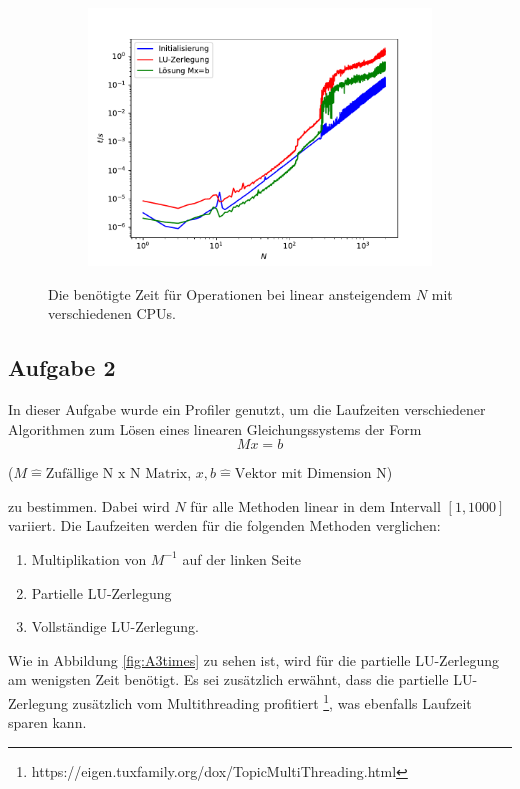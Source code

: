 \documentclass{scrartcl}
\begin{document}
\begin{figure}[h]
\begin{subfigure}{0.4\textwidth}
		\includegraphics[width=\textwidth]{A2/Dann_halt_so/timers_lin_Prd.pdf}
		\end{subfigure}
		\caption{Die benötigte Zeit für Operationen bei linear ansteigendem $N$ mit verschiedenen CPUs.}
		\label{fig:time_lin}
        \end{figure}
        
        \subsection*{Aufgabe 2}
        In dieser Aufgabe wurde ein Profiler genutzt, um die Laufzeiten verschiedener Algorithmen zum Lösen eines linearen Gleichungssystems der Form 
        \begin{equation}
            Mx=b
        \end{equation}
        \begin{center}
            \tiny{($M \hat{=} \text{Zufällige N x N Matrix}$, $x, b \hat{=} \text{Vektor mit Dimension N}$)}
        \end{center}
        zu bestimmen. Dabei wird $N$ für alle Methoden linear in dem Intervall $[1, 1000]$ variiert. 
        Die Laufzeiten werden für die folgenden Methoden verglichen: 
        \begin{enumerate}
            \item Multiplikation von $M^{-1}$ auf der linken Seite \label{M1}
            \item Partielle LU-Zerlegung
            \item Vollständige LU-Zerlegung.
        \end{enumerate} 
        Wie in Abbildung \ref{fig:A3times} zu sehen ist, wird für die partielle LU-Zerlegung am wenigsten Zeit benötigt. Es sei zusätzlich erwähnt, dass die partielle LU-Zerlegung zusätzlich vom Multithreading profitiert \footnote[1]{https://eigen.tuxfamily.org/dox/TopicMultiThreading.html}, was ebenfalls Laufzeit sparen kann.
\end{document}
